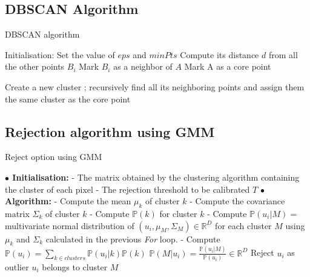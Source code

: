 \documentclass{siamart171218}
\begin{document}
\begin{appendices}
\subsection{DBSCAN Algorithm}
\label{Annexe:DBSCAN}

\begin{algorithm}[h!]
	\caption{DBSCAN algorithm} 
	\begin{algorithmic}[1]
	    \State Initialisation:
	    \State Set the value of $eps$ and $minPts$
			\State Compute its distance $d$ from all the other points $B_i$
			        \State Mark $B_i$ as a neighbor of $A$
			    \EndIf
			    \State Mark A as a core point
			\EndIf
		\EndFor
		
			    \State Create a new cluster ; recursively find all its neighboring points and assign them the same cluster as the core point
			\EndIf
		\EndFor
	\end{algorithmic} 
	\label{algo:DBSCAN}
\end{algorithm}


\subsection{Rejection algorithm using GMM}
\label{Annexe:GMM_reject}

\begin{algorithm}[H]
	\caption{Reject option using GMM} 
	\begin{algorithmic}[4]
	    \State \textbf{$\bullet$ Initialisation:}
	    \State - The matrix obtained by the clustering algorithm containing the cluster of each pixel  
	    \State - The rejection threshold to be calibrated $T$ 
	    \State \textbf{$\bullet$ Algorithm:}
		            \State - Compute the mean $\mu_k$ of cluster $k$
		            \State - Compute the covariance matrix $\Sigma_k$ of cluster $k$
		            \State - Compute $\mathbb{P}(k)$ for cluster $k$ 
		        \EndFor
		             \State - Compute $\mathbb{P}(u_i|M) = $ multivariate normal distribution of $(u_i,\mu_M,\Sigma_M) \in \mathbb{R}^D$ \State for each cluster $M$ using  $\mu_k$ and $\Sigma_k$ calculated in the previous \textit{For} loop. 
		             \State - Compute $\mathbb{P}(u_i) = \sum_{k \in clusters} \mathbb{P}(u_i|k)\mathbb{P}(k)  $
		                \State $\mathbb{P}(M|u_i) = \frac{\mathbb{P}(u_i|M)}{\mathbb{P}(u_i)} \in \mathbb{R}^D$
		             \EndIf
		             \State Reject $u_i$ as outlier
		          \Else
		            \State $u_i$ belongs to cluster $M$
		            \EndIf 
		          \EndFor
		    \EndFor
		\EndWhile
	\end{algorithmic} 
	\label{Algo:reject_GMM}
\end{algorithm}


\end{appendices}
\end{document}
